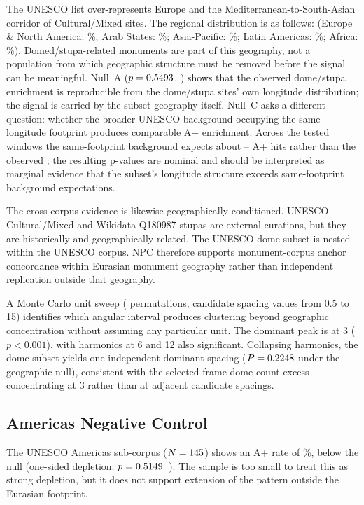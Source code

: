 The UNESCO list over-represents Europe and the
Mediterranean-to-South-Asian corridor of Cultural/Mixed sites. 
The regional distribution is as follows: 
(Europe \& North America: \CorpusPctEurope\%;
Arab States: \CorpusPctArabStates\%;
Asia-Pacific: \CorpusPctAsiaPac\%;
Latin Americas: \CorpusPctLatAm\%;
Africa: \CorpusPctAfrica\%).
Domed/stupa-related monuments are part of this geography, not a
population from which geographic structure must be removed before the
signal can be meaningful. Null~A ($p = 0.5493$,
\geoNullDomeBootPSig{}) shows that the observed dome/stupa enrichment
is reproducible from the dome/stupa sites' own longitude distribution;
the signal is carried by the subset geography itself. Null~C asks a
different question: whether the broader UNESCO background occupying
the same longitude footprint produces comparable A+ enrichment. Across
the tested windows the same-footprint background expects about
\geoNullDomeRestrictedMeantwo{}--\geoNullDomeRestrictedMeanten{} A+
hits rather than the observed \NcircTierAp{}; the resulting p-values
are nominal and should be interpreted as marginal evidence that the subset's
longitude structure exceeds same-footprint background expectations.

The cross-corpus evidence is likewise geographically conditioned.
UNESCO Cultural/Mixed and Wikidata Q180987 stupas are external
curations, but they are historically and geographically related. The
UNESCO dome subset is nested within the UNESCO corpus. NPC therefore
supports monument-corpus anchor concordance within Eurasian monument
geography rather than independent replication outside that geography.

A Monte Carlo unit sweep (\mcNperms{} permutations, \mcNcandidates{} candidate
spacing values from 0.5\textdegree{} to 15\textdegree{}) identifies which
angular interval produces clustering beyond geographic concentration without
assuming any particular unit. The dominant peak is at 3\textdegree{} ($p < 0.001$),
with harmonics at 6\textdegree{} and 12\textdegree{} also significant.
Collapsing harmonics, the dome subset yields one independent
dominant spacing ($P = 0.2248{}$ under the geographic null),
consistent with the selected-frame dome count excess concentrating at
3\textdegree{} rather than at adjacent candidate spacings.

\subsection{Americas Negative Control}
\label{sec:americas_negative_control}
The UNESCO Americas sub-corpus ($N = 145$) shows an A+ rate of
\AmericasApRate\%, below the \NullRateAp{} null
(one-sided depletion: $p = 0.5149$~\AmericasOneSidedStar{}).
The sample is too small to treat this as strong depletion,
but it does not support extension of the pattern outside the Eurasian
footprint.

